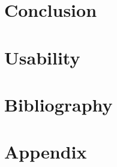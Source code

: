 \documentclass[a4paper,11pt]{article}
\begin{document}
\section{Conclusion}

\section{Usability}

\section{Bibliography}



\section{Appendix}



\newpage

\end{document}
